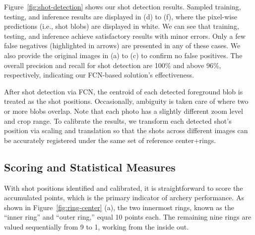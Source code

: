 \documentclass[runningheads]{llncs}
\begin{document}
Figure~\ref{fig:shot-detection} shows our shot detection results. Sampled training, testing, and inference results are displayed in (d) to (f), where the pixel-wise predictions (i.e., shot blobs) are displayed in white. We can see that training, testing, and inference achieve satisfactory results with minor errors. Only a few false negatives (highlighted in arrows) are presented in any of these cases. We also provide the original images in (a) to (c) to confirm no false positives. 
The overall precision and recall for shot detection are 100\% and above 96\%, respectively, indicating our FCN-based solution's effectiveness. 

After shot detection via FCN, the centroid of each detected foreground blob is treated as the shot positions. Occasionally, ambiguity is taken care of where two or more blobs overlap.  
Note that each photo has a slightly different zoom level and crop range. To calibrate the results, we transform each detected shot's position via scaling and translation so that the shots across different images can be accurately registered under the same set of reference center+rings. 

\subsection{Scoring and Statistical Measures}

With shot positions identified and calibrated, it is straightforward to score the accumulated points, which is the primary indicator of archery performance. 
As shown in Figure~\ref{fig:ring-center} (a), the two innermost rings, known as the ``inner ring'' and ``outer ring,'' equal 10 points each. The remaining nine rings are valued sequentially from 9 to 1, working from the inside out.


\end{document}
